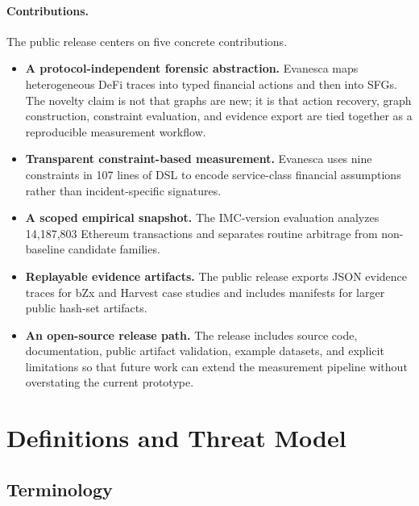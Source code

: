 \documentclass[10pt]{article}
\newcommand{\sys}{Evanesca\xspace}
\newcommand{\numtransactions}{14,187,803\xspace}
\newcommand{\numconstraints}{nine\xspace}
\newcommand{\numdsllines}{107\xspace}
\begin{document}
\paragraph{Contributions.}
The public release centers on five concrete contributions.
\begin{itemize}
  \item \textbf{A protocol-independent forensic abstraction.} \sys maps
  heterogeneous DeFi traces into typed financial actions and then into SFGs.
  The novelty claim is not that graphs are new; it is that action recovery,
  graph construction, constraint evaluation, and evidence export are tied
  together as a reproducible measurement workflow.
  \item \textbf{Transparent constraint-based measurement.} \sys uses
  \numconstraints constraints in \numdsllines lines of DSL to encode
  service-class financial assumptions rather than incident-specific
  signatures.
  \item \textbf{A scoped empirical snapshot.} The IMC-version evaluation
  analyzes \numtransactions Ethereum transactions and separates routine
  arbitrage from non-baseline candidate families.
  \item \textbf{Replayable evidence artifacts.} The public release exports
  JSON evidence traces for bZx and Harvest case studies and includes manifests
  for larger public hash-set artifacts.
  \item \textbf{An open-source release path.} The release includes source code,
  documentation, public artifact validation, example datasets, and explicit
  limitations so that future work can extend the measurement pipeline without
  overstating the current prototype.
\end{itemize}

\section{Definitions and Threat Model}
\label{sec:threat}

\subsection{Terminology}
\end{document}
